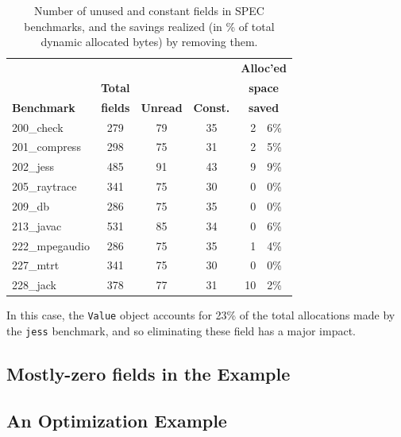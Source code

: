 \documentclass[preprint]{acmconf}
\begin{document}
\begin{table}
\begin{tabular}{lcccr@{.}l}
&&&&\multicolumn{2}{c}{\bf Alloc'ed}\\
&\bf Total&&&\multicolumn{2}{c}{\bf space}\\
\bf Benchmark &\bf fields &\bf Unread &\bf Const. &
\multicolumn{2}{c}{\bf saved} \\\hline
200\_check      & 279 &   79   &   35   &  2&6\% \\
201\_compress   & 298 &   75   &   31   &  2&5\% \\
202\_jess       & 485 &   91   &   43   &  9&9\% \\
205\_raytrace   & 341 &   75   &   30   &  0&0\% \\
209\_db         & 286 &   75   &   35   &  0&0\% \\
213\_javac      & 531 &   85   &   34   &  0&6\% \\
222\_mpegaudio  & 286 &   75   &   35   &  1&4\% \\
227\_mtrt       & 341 &   75   &   30   &  0&0\% \\
228\_jack       & 378 &   77   &   31   & 10&2\% \\
\end{tabular}
\caption{Number of unused and constant fields in SPEC benchmarks,
  and the savings realized (in \% of total dynamic allocated bytes) by
  removing them.}
\label{tab:const-unused}
\end{table}

In this case, the {\tt Value} object accounts for 23\% of the total
allocations made by the {\tt jess} benchmark, and so eliminating these
field has a major impact.

\subsection{Mostly-zero fields in the Example}
\subsection{An Optimization Example}

\end{document}
